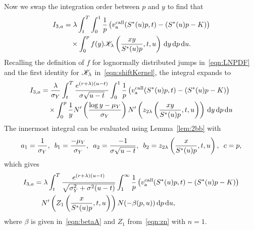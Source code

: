 	Now we swap the integration order between $p$ and $y$ to find that
		\begin{align*}
			I_{3,a} &=  \lambda  \int_t^T \int_0^1 \frac{1}{p} \left( v_{\text{a}}^{\text{call}}(S^*(u)p,t) - (S^*(u)p-K) \right)  \\
			&\quad {} \times \int_0^p f(y)\mathscr K_\lambda\left( \frac{xy}{S^*(u)p},t,u \right) \, \mathrm d y \, \mathrm d p \, \mathrm d u.
		\end{align*}
	Recalling the definition of $f$ for lognormally distributed jumps in~\eqref{eqn:LNPDF} and the first identity for $\mathscr K_\lambda$ in~\eqref{eqn:shiftKernel}, the integral expands to
		\begin{align*}
			I_{3,a} &=  \frac{\lambda}{\sigma_Y}  \int_t^T \frac{e^{(r+\lambda)(u-t)}}{\sigma\sqrt{u-t}} \int_0^1 \frac{1}{p} \left( v_{\text{a}}^{\text{call}}(S^*(u)p,t) - (S^*(u)p-K) \right)  \\
			&\quad {} \times \int_0^p \frac{1}{y}N'\left( \frac{\log y - \mu_Y}{\sigma_Y} \right)N'\left( z_{2\lambda}\left( \frac{xy}{S^*(u)p}, t, u \right)\right) \, \mathrm d y \, \mathrm d p \, \mathrm d u 
		\end{align*}
		The innermost integral can be evaluated using Lemma~\ref{lem:2bb} with
		$$
			a_1 = \frac{1}{\sigma_Y}, \enskip b_1 = \frac{-\mu_Y}{\sigma_Y}, \enskip a_2 = \frac{-1}{\sigma\sqrt{u-t}}, \enskip
			b_2 = z_{2\lambda}\left( \frac{x}{S^*(u)p}, t, u \right), \enskip c = p,
		$$
		which gives
		\begin{align*}
			 I_{3,a} &=  \lambda  \int_t^T \frac{e^{(r+\lambda)(u-t)}}{\sqrt{\sigma_Y^2 + \sigma^2(u-t)}} \int_1^\infty \frac{1}{p} \left( v_{\text{a}}^{\text{call}}(S^*(u)p,t) - (S^*(u)p - K) \right)  \\
			&\quad {} N'\left( Z_1 \left( \frac{x}{S^*(u)p}, t, u \right)\right)N(-\beta(p,u)) \, \mathrm d p \, \mathrm d u,
		\end{align*}	
		where $\beta$ is given in~\eqref{eqn:betaA} and $Z_1$ from~\eqref{eqn:zn} with $n=1$.
		
